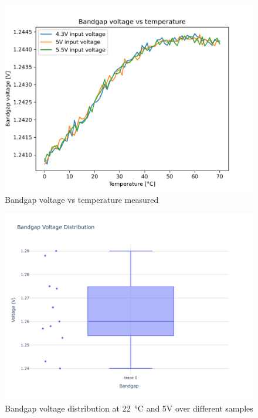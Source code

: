 \begin{figure}[ht]
	\centering
	\includegraphics[width=\textwidth]{images/05_bandgap/Bandgap.png}
	\caption{Bandgap voltage vs temperature measured}
	\label{fig:bandgap_voltage_vs_temp_mes}
\end{figure}
\begin{figure}[ht]
	\centering
	\includegraphics[width=\textwidth]{images/Bandgap_Voltage_Distribution.png}
	\caption{Bandgap voltage distribution at \qty{22}{\degreeCelsius} and 5V over different samples}
	\label{fig:bandgap_voltage_distrb}
\end{figure}

